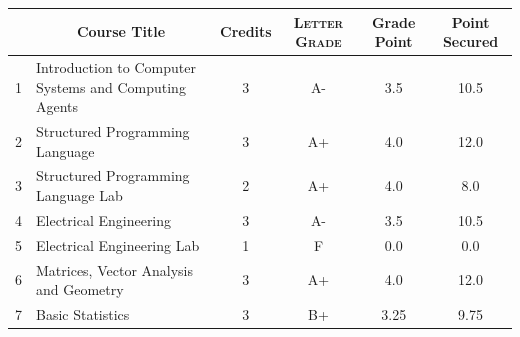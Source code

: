 \documentclass[11pt]{article}
\newcommand*{\numtwo}[1]{\pgfmathprintnumber[
                    fixed, precision=2, fixed zerofill=true]{#1}}
\begin{document}
                \begin{center}
                    \renewcommand{\arraystretch}{1.08}
                    
                \begin{tabular}{|c|l|c|>{\scshape}c|c|c|}
                \hline  \rule[-1ex]{0pt}{3.5ex} {\centering{\bf Course Code}} &  \multicolumn{1}{c|}{\textbf{Course Title}}  & {\bf Credits} & {\bf Letter Grade} & {\bf Grade Point} & {\bf Point Secured}  \\ 
                \hline   1 &  Introduction to Computer Systems and Computing Agents		 & 3 & A- & 3.5 & 10.5 \\ %
                \hline   2 &  Structured Programming Language		 & 3 & A+ & 4.0 & 12.0 \\ %
                \hline   3 &  Structured Programming Language Lab		 & 2 & A+ & 4.0 & 8.0 \\ %
                \hline   4 &  Electrical Engineering		 & 3 & A- & 3.5 & 10.5 \\ %
                \hline   5 &  Electrical Engineering Lab		 & 1 & F & 0.0 & 0.0 \\ %
                \hline   6 &  Matrices, Vector Analysis and Geometry		 & 3 & A+ & 4.0 & 12.0 \\ %
                \hline   7 &  Basic Statistics		 & 3 & B+ & 3.25 & 9.75 \\ %

\hline                %
                \end{tabular}
                \end{center}
                \renewcommand{\arraystretch}{1.03}
\end{document}
